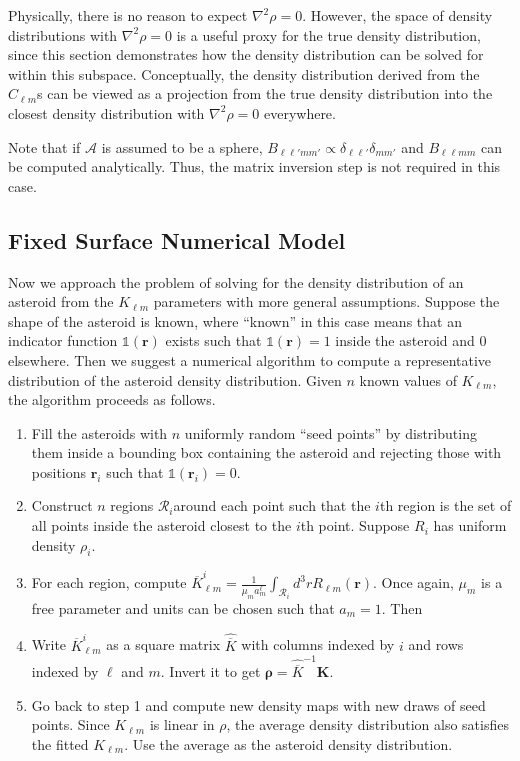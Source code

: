 \documentclass[linenumbers]{aastex631}
\begin{document}
Physically, there is no reason to expect $\nabla^2 \rho = 0$. However, the space of density distributions with $\nabla^2 \rho = 0$ is a useful proxy for the true density distribution, since this section demonstrates how the density distribution can be solved for within this subspace. Conceptually, the density distribution derived from the $C_{\ell m}$s can be viewed as a projection from the true density distribution into the closest density distribution with $\nabla^2 \rho = 0$ everywhere.

Note that if $\mathcal{A}$ is assumed to be a sphere, $B_{\ell \ell' m m'} \propto \delta_{\ell \ell'} \delta_{m m'}$ and $B_{\ell \ell m m}$ can be computed analytically. Thus, the matrix inversion step is not required in this case.

\subsection{Fixed Surface Numerical Model}
Now we approach the problem of solving for the density distribution of an asteroid from the $K_{\ell m}$ parameters with more general assumptions. Suppose the shape of the asteroid is known, where ``known'' in this case means that an indicator function $\mathds{1}(\mathbf r)$ exists such that $\mathds{1}(\mathbf r) = 1$  inside the asteroid and 0 elsewhere. Then we suggest a numerical algorithm to compute a representative distribution of the asteroid density distribution. Given $n$ known values of $K_{\ell m}$, the algorithm proceeds as follows.
\begin{enumerate}
\item Fill the asteroids with $n$ uniformly random ``seed points'' by distributing them inside a bounding box containing the asteroid and rejecting those with positions $\mathbf r_i$ such that $\mathds{1}(\mathbf r_i) = 0.$
\item Construct $n$ regions $\mathcal{R}_i$around each point such that the $i$th region is the set of all points inside the asteroid closest to the $i$th point. Suppose $R_i$ has uniform density $\rho_i$.
\item For each region, compute $\overline K_{\ell m}^i = \frac{1}{\mu_m a_m^\ell}\int_{\mathcal{R}_i} d^3 r R_{\ell m}(\mathbf r)$. Once again, $\mu_m$ is a free parameter and units can be chosen such that $a_m=1$. Then %
\item Write $\overline K_{\ell m}^i$ as a square matrix $\hat{\overline K}$ with columns indexed by $i$ and rows indexed by $\ell$ and $m$. Invert it to get $\mathbf \rho = \hat {\overline K}^{-1} \mathbf K$.
\item Go back to step 1 and compute new density maps with new draws of seed points. Since $K_{\ell m}$ is linear in $\rho$, the average density distribution also satisfies the fitted $K_{\ell m}$. Use the average as the asteroid density distribution.
\end{enumerate}
\end{document}
